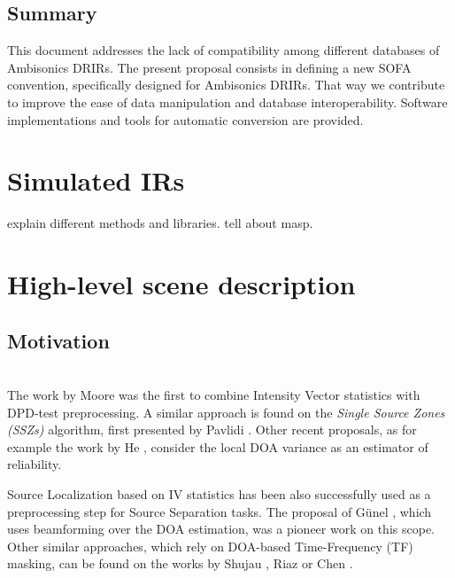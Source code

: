 \subsection{Summary} 

This document addresses the lack of compatibility among different databases of Ambisonics DRIRs. The present proposal consists in defining a new SOFA convention, specifically designed for Ambisonics DRIRs. That way we contribute to improve the ease of data manipulation and database interoperability. Software implementations and tools for automatic conversion are provided.



\section{Simulated IRs}

explain different methods and libraries.
tell about masp.






\section{High-level scene description}

\subsection{Motivation}


\\
The work by Moore \cite{Moore2015} was the first to combine Intensity Vector statistics with DPD-test preprocessing. A similar approach is found on the \textit{Single Source Zones (SSZs)} algorithm, first presented by Pavlidi \cite{Pavlidi2015}. Other recent proposals, as for example the work by He \cite{He2017}, consider the local DOA variance as an estimator of reliability. 

Source Localization based on IV statistics has been also successfully used as a preprocessing step for Source Separation tasks. The proposal of G\"unel \cite{Gunel2008}, which uses beamforming over the DOA estimation, was a pioneer work on this scope. Other similar approaches, which rely on DOA-based Time-Frequency (TF) masking, can be found on the works by Shujau \cite{Shujau2011}, Riaz \cite{Riaz2015} or Chen \cite{Chen2015}.



